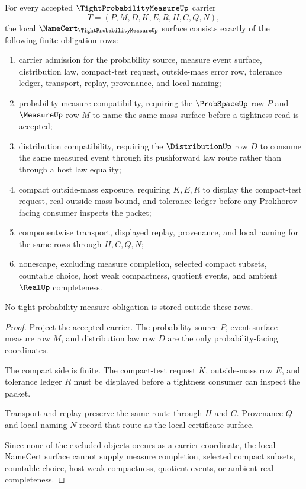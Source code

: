 \begin{theorem}
\label{thm:tight-probability-measure-namecert-obligations}
For every accepted $\TightProbabilityMeasureUp$ carrier
$$
T=(P,M,D,K,E,R,H,C,Q,N),
$$
the local $\NameCert_{\TightProbabilityMeasureUp}$ surface consists exactly of the following finite obligation rows:
\begin{enumerate}
\item carrier admission for the probability source, measure event surface, distribution law, compact-test request, outside-mass error row, tolerance ledger, transport, replay, provenance, and local naming;
\item probability-measure compatibility, requiring the $\ProbSpaceUp$ row $P$ and $\MeasureUp$ row $M$ to name the same mass surface before a tightness read is accepted;
\item distribution compatibility, requiring the $\DistributionUp$ row $D$ to consume the same measured event through its pushforward law route rather than through a host law equality;
\item compact outside-mass exposure, requiring $K,E,R$ to display the compact-test request, real outside-mass bound, and tolerance ledger before any Prokhorov-facing consumer inspects the packet;
\item componentwise transport, displayed replay, provenance, and local naming for the same rows through $H,C,Q,N$;
\item nonescape, excluding measure completion, selected compact subsets, countable choice, host weak compactness, quotient events, and ambient $\RealUp$ completeness.
\end{enumerate}
No tight probability-measure obligation is stored outside these rows.
\end{theorem}
\begin{proof}
Project the accepted carrier. The probability source $P$, event-surface measure row $M$, and distribution law row $D$ are the only probability-facing coordinates.

The compact side is finite. The compact-test request $K$, outside-mass row $E$, and tolerance ledger $R$ must be displayed before a tightness consumer can inspect the packet.

Transport and replay preserve the same route through $H$ and $C$. Provenance $Q$ and local naming $N$ record that route as the local certificate surface.

Since none of the excluded objects occurs as a carrier coordinate, the local NameCert surface cannot supply measure completion, selected compact subsets, countable choice, host weak compactness, quotient events, or ambient real completeness.
\end{proof}

